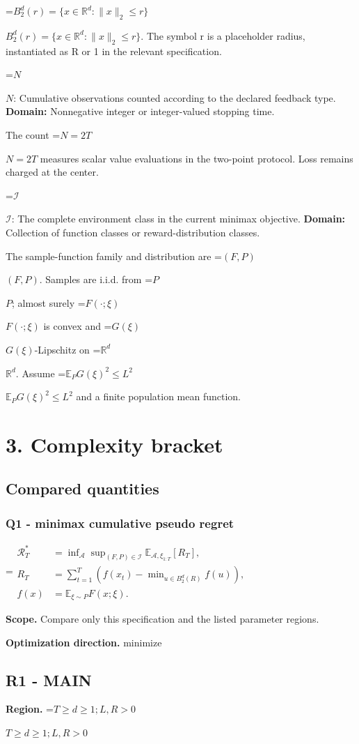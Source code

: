\documentclass[10pt,a4paper]{article}
\newcommand{\AtlasMath}[1]{\par\begingroup\centering\setbox0=\hbox{$\displaystyle #1$}\ifdim\wd0>1.4\linewidth\typeout{ATLAS WIDE FORMULA: \the\wd0}\fi\ifdim\wd0>\linewidth\resizebox{\linewidth}{!}{\box0}\else\box0\fi\par\endgroup}
\newcommand{\AtlasInlineMath}[1]{\begingroup\setbox0=\hbox{$#1$}\ifdim\wd0>.4\linewidth\endgroup\AtlasMath{#1}\else\endgroup$#1$\fi}
\begin{document}
\AtlasInlineMath{B_2^d(r)=\{x\in\mathbb R^d:\|x\|_2\le r\}}. The symbol r is a placeholder radius, instantiated as R or 1 in the relevant specification.

\AtlasInlineMath{N}: Cumulative observations counted according to the declared feedback type. \textbf{Domain:} Nonnegative integer or integer-valued stopping time.

The count \AtlasInlineMath{N=2T} measures scalar value evaluations in the two-point protocol. Loss remains charged at the center.

\AtlasInlineMath{\mathcal I}: The complete environment class in the current minimax objective. \textbf{Domain:} Collection of function classes or reward-distribution classes.

The sample-function family and distribution are \AtlasInlineMath{(F,P)}. Samples are i.i.d. from \AtlasInlineMath{P}; almost surely \AtlasInlineMath{F(\cdot;\xi)} is convex and \AtlasInlineMath{G(\xi)}-Lipschitz on \AtlasInlineMath{\mathbb R^d}. Assume \AtlasInlineMath{\mathbb E_PG(\xi)^2\le L^2} and a finite population mean function.

\section{3. Complexity bracket}
\subsection{Compared quantities}
\subsubsection{Q1 - minimax cumulative pseudo regret}
\AtlasMath{\begin{aligned}\mathcal R_T^*&=\inf_{\mathcal A}\sup_{(F,P)\in\mathcal I}\mathbb E_{\mathcal A,\xi_{1:T}}[R_T],\\ R_T&=\sum_{t=1}^T\left(f(x_t)-\min_{u\in B_2^d(R)}f(u)\right),\\ f(x)&=\mathbb E_{\xi\sim P}F(x;\xi).\end{aligned}}
\textbf{Scope.} Compare only this specification and the listed parameter regions.

\textbf{Optimization direction.} minimize

\subsection{R1 - MAIN}
\textbf{Region.} \AtlasInlineMath{T\ge d\ge 1; L,R>0}
\end{document}
